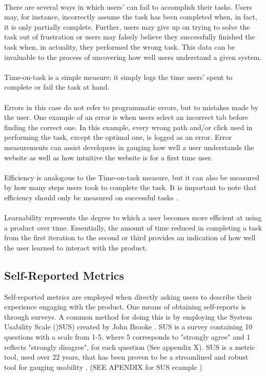 \\
There are several ways in which users' can fail to accomplish their tasks. Users may, for instance, incorrectly assume the task has been completed when, in fact, it is only partially complete. Further, users may give up on trying to solve the task out of frustration or users may falsely believe they successfully finished the task when, in actuality, they performed the wrong task. This data can be invaluable to the process of uncovering how well users understand a given system. 
\\\\
Time-on-task is a simple measure; it simply logs the time users' spent to complete or fail the task at hand.
\\\\
Errors in this case do not refer to programmatic errors, but to mistakes made by the user. One example of an error is when users select an incorrect tab before finding the correct one. In this example, every wrong path and/or click used in performing the task, except the optimal one, is logged as an error. Error measurements can assist developers in gauging how well a user understands the website as well as how intuitive the website is for a first time user. 
\\\\
Efficiency is analogous to the Time-on-task measure, but it can also be measured by how many steps users took to complete the task. It is important to note that efficiency should only be measured on successful tasks \cite{tullis_albert_2011}.
\\\\
Learnability represents the degree to which a user becomes more efficient at using a product over time. Essentially, the amount of time reduced in completing a task from the first iteration to the second or third provides an indication of how well the user learned to interact with the product. 
\subsection{Self-Reported Metrics}
Self-reported metrics are employed when directly asking users to describe their experience engaging with the product. One means of obtaining self-reports is through surveys. A common method for doing this is by employing the System Usability Scale ()SUS) created by John Brooke \cite{tullis_albert_2011} \cite{brooke1996sus}. SUS is a survey containing 10 questions with a scale from 1-5, where 5 corresponds to "strongly agree" and 1 reflects "strongly disagree", for each question (See appendix X). SUS is a metric tool, used over 22 years, that has been proven to be a streamlined and robust tool for gauging usability \cite{brooke1996sus}.  (SEE APENDIX for SUS ecample )
